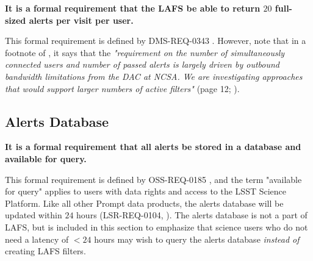 \documentclass[DM,authoryear,toc]{lsstdoc}
\begin{document}
{\bf It is a formal requirement that the LAFS be able to return $20$ full-sized alerts per visit per user.}

This formal requirement is defined by DMS-REQ-0343 . However, note that in a footnote of , it says that the {\it "requirement on the number of simultaneously connected users and number of passed alerts is largely driven by outbound bandwidth limitations from the DAC at NCSA. We are investigating approaches that would support larger numbers of active filters"} (page 12; ).



\subsection{Alerts Database}\label{ssec:LAFS_adb}

{\bf It is a formal requirement that all alerts be stored in a database and available for query.}

This formal requirement is defined by OSS-REQ-0185 , and the term "available for query" applies to users with data rights and access to the LSST Science Platform. Like all other Prompt data products, the alerts database will be updated within $24$ hours  (LSR-REQ-0104, ). The alerts database is not a part of LAFS, but is included in this section to emphasize that science users who do not need a latency of $<24$ hours may wish to query the alerts database {\it instead of} creating LAFS filters.





\end{document}
